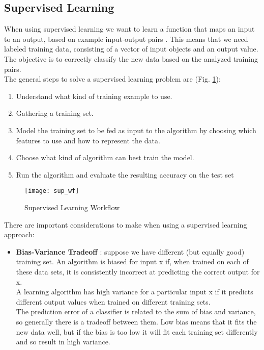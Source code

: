 \subsection{Supervised Learning} \label{supervised}
When using supervised learning we want to learn a function that maps an input to an output, based on example input-output pairs \cite{ai_sup}. This means that we need labeled training data, consisting of a vector of input objects and an output value. The objective is to correctly classify the new data based on the analyzed training pairs. \\
The general steps to solve a supervised learning problem are (Fig. \ref{fig:sup_wf}):
\begin{enumerate}
	\setlength{\itemsep}{0pt}
	\item Understand what kind of training example to use.
	\item Gathering a training set.
	\item Model the training set to be fed as input to the algorithm by choosing which features to use and how to represent the data.
	\item Choose what kind of algorithm can best train the model.
	\item Run the algorithm and evaluate the resulting accuracy on the test set 
\end{enumerate}

\begin{figure}[H]
	\centering
	\texttt{[image: sup\_wf]}
	\caption{Supervised Learning Workflow \cite{sup_wf}}
	\label{fig:sup_wf}
\end{figure}

There are important considerations to make when using a supervised learning approach:
\begin{itemize}
	\item \textbf{Bias-Variance Tradeoff} \cite{biasvar}: suppose we have different (but equally good) training set. An algorithm is biased for input x if, when trained on each of these data sets, it is consistently incorrect at predicting the correct output for x. \\
	A learning algorithm has high variance for a particular input x if it predicts different output values when trained on different training sets. \\
	The prediction error of a classifier is related to the sum of bias and variance, so generally there is a tradeoff between them. Low bias means that it fits the new data well, but if the bias is too low it will fit each training set differently and so result in high variance.
\end{itemize}

